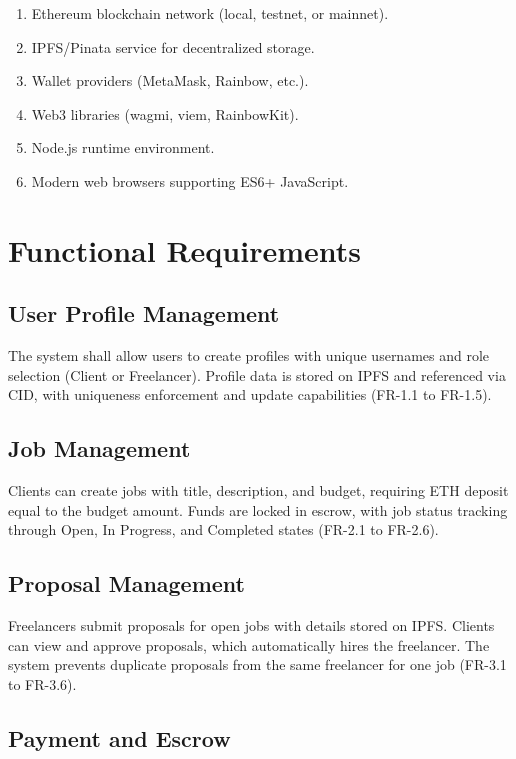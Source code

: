 \begin{enumerate}
    \item Ethereum blockchain network (local, testnet, or mainnet).
    \item IPFS/Pinata service for decentralized storage.
    \item Wallet providers (MetaMask, Rainbow, etc.).
    \item Web3 libraries (wagmi, viem, RainbowKit).
    \item Node.js runtime environment.
    \item Modern web browsers supporting ES6+ JavaScript.
\end{enumerate}

\section{Functional Requirements}

\subsection{User Profile Management}

The system shall allow users to create profiles with unique usernames and role selection (Client or Freelancer). Profile data is stored on IPFS and referenced via CID, with uniqueness enforcement and update capabilities (FR-1.1 to FR-1.5).

\subsection{Job Management}

Clients can create jobs with title, description, and budget, requiring ETH deposit equal to the budget amount. Funds are locked in escrow, with job status tracking through Open, In Progress, and Completed states (FR-2.1 to FR-2.6).

\subsection{Proposal Management}

Freelancers submit proposals for open jobs with details stored on IPFS. Clients can view and approve proposals, which automatically hires the freelancer. The system prevents duplicate proposals from the same freelancer for one job (FR-3.1 to FR-3.6).

\subsection{Payment and Escrow}

